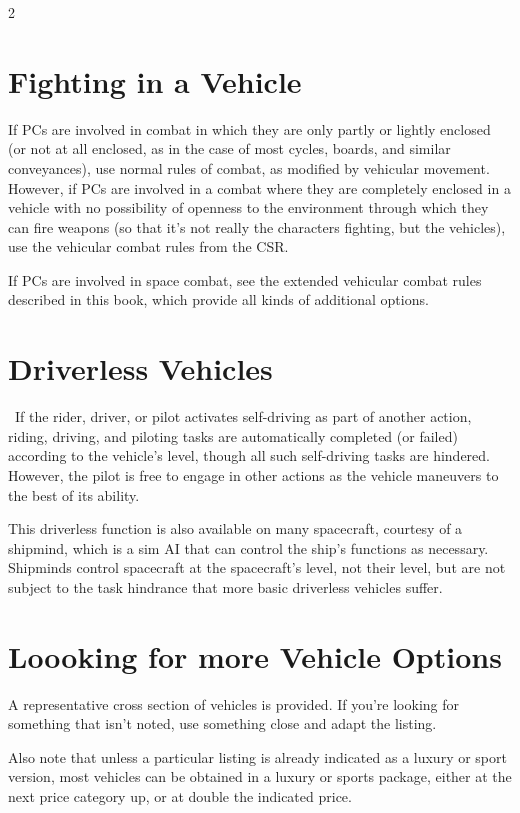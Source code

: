 \begin{multicols}{2}
\section{Fighting in a Vehicle}

If PCs are involved in combat in which they are only partly or lightly enclosed (or not at all enclosed, as in the case of most cycles, boards, and similar conveyances), use normal rules of combat, as modified by vehicular movement. However, if PCs are involved in a combat where they are completely enclosed in a vehicle with no possibility of openness to the environment through which they can fire weapons (so that it’s not really the characters fighting, but the vehicles), use the vehicular combat rules from the CSR. 

If PCs are involved in space combat, see the extended vehicular combat rules described in this book, which provide all kinds of additional options.

\section{Driverless Vehicles}

 If the rider, driver, or pilot activates self-driving as part of another action, riding, driving, and piloting tasks are automatically completed (or failed) according to the vehicle’s level, though all such self-driving tasks are hindered. However, the pilot is free to engage in other actions as the vehicle maneuvers to the best of its ability.

This driverless function is also available on many spacecraft, courtesy of a shipmind, which is a sim AI that can control the ship’s functions as necessary. Shipminds control spacecraft at the spacecraft’s level, not their level, but are not subject to the task hindrance that more basic driverless vehicles suffer.

\section{Loooking for more Vehicle Options}

A representative cross section of vehicles is provided. If you’re looking for something that isn’t noted, use something close and adapt the listing.

Also note that unless a particular listing is already indicated as a luxury or sport version, most vehicles can be obtained in a luxury or sports package, either at the next price category up, or at double the indicated price.


\end{multicols}
